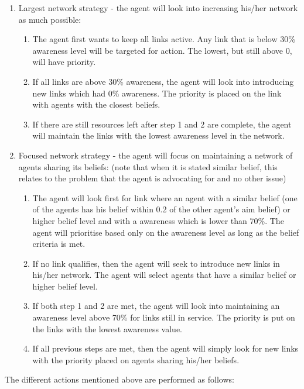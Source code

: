 \begin{enumerate}
\item Largest network strategy - the agent will look into increasing his/her network as much possible:
	\begin{enumerate}
	\item The agent first wants to keep all links active. Any link that is below 30\% awareness level will be targeted for action. The lowest, but still above 0, will have priority.
	\item If all links are above 30\% awareness, the agent will look into introducing new links which had 0\% awareness. The priority is placed on the link with agents with the closest beliefs.
	\item If there are still resources left after step 1 and 2 are complete, the agent will maintain the links with the lowest awareness level in the network.
	\end{enumerate}

\item Focused network strategy - the agent will focus on maintaining a network of agents sharing its beliefs: (note that when it is stated similar belief, this relates to the problem that the agent is advocating for and no other issue)
	\begin{enumerate}
	\item The agent will look first for link where an agent with a similar belief (one of the agents has his belief within 0.2 of the other agent's aim belief) or higher belief level and with a awareness which is lower than 70\%. The agent will prioritise based only on the awareness level as long as the belief criteria is met.
	\item If no link qualifies, then the agent will seek to introduce new links in his/her network. The agent will select agents that have a similar belief or higher belief level.
	\item If both step 1 and 2 are met, the agent will look into maintaining an awareness level above 70\% for links still in service. The priority is put on the links with the lowest awareness value.
	\item If all previous steps are met, then the agent will simply look for new links with the priority placed on agents sharing his/her beliefs.
	\end{enumerate}
\end{enumerate}

The different actions mentioned above are performed as follows:

